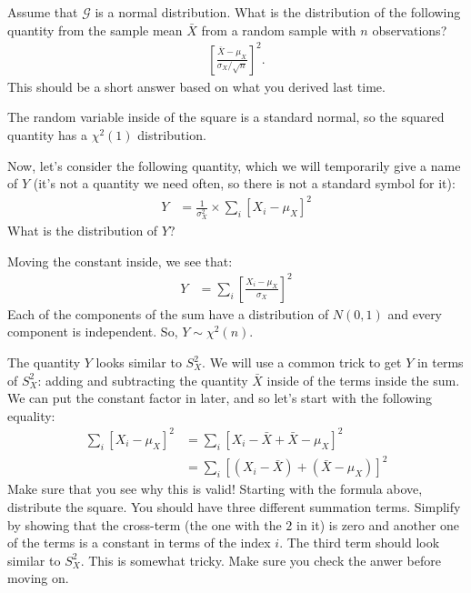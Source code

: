 
Assume that $\mathcal{G}$ is a normal distribution. What is the distribution
of the following quantity from the sample mean $\bar{X}$ from a random sample
with $n$ observations?
\begin{align*}
\left[\frac{\bar{X} - \mu_X}{\sigma_X / \sqrt{n}} \right]^2.
\end{align*}
This should be a short answer based on what you derived last time.


The random variable inside of the square is a standard normal, so
the squared quantity has a $\chi^2(1)$ distribution.


Now, let's consider the following quantity, which we will temporarily
give a name of $Y$ (it's not a quantity we need often, so there is not
a standard symbol for it):
\begin{align*}
Y &= \frac{1}{\sigma_X^2} \times \sum_i \left[ X_i - \mu_X \right]^2 
\end{align*}
What is the distribution of $Y$?


Moving the constant inside, we see that:
\begin{align*}
Y &=  \sum_i \left[ \frac{X_i - \mu_X}{\sigma_X} \right]^2 
\end{align*}
Each of the components of the sum have a distribution of $N(0, 1)$ and
every component is independent. So, $Y \sim \chi^2(n)$.


The quantity $Y$ looks similar to $S_X^2$. We will use a common trick to
get $Y$ in terms of $S_X^2$: adding and subtracting the quantity $\bar{X}$
inside of the terms inside the sum. We can put the constant factor in later,
and so let's start with the following equality:
\begin{align*}
\sum_i \left[ X_i - \mu_X \right]^2 &= \sum_i \left[ X_i - \bar{X} + \bar{X} - \mu_X \right]^2  \\
&= \sum_i \left[ (X_i - \bar{X}) + (\bar{X} - \mu_X) \right]^2 
\end{align*}
Make sure that you see why this is valid! Starting with the
formula above, distribute the square. You should have three different summation
terms. Simplify by showing that the cross-term (the one with the $2$ in it) is
zero and another one of the terms is a constant in terms of the index $i$. The
third term should look similar to $S_X^2$. This is somewhat tricky. Make sure
you check the anwer before moving on.

